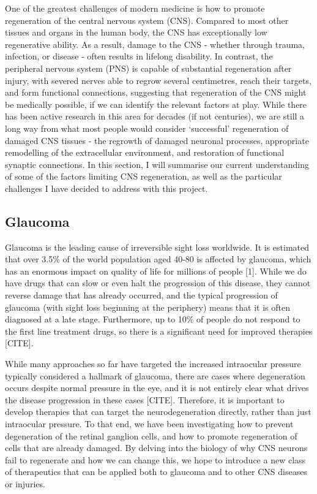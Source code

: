 \documentclass[
  12pt,
  a4paper,
]{book}
\begin{document}
One of the greatest challenges of modern medicine is how to promote regeneration of the central nervous system (CNS). Compared to most other tissues and organs in the human body, the CNS has exceptionally low regenerative ability. As a result, damage to the CNS - whether through trauma, infection, or disease - often results in lifelong disability. In contrast, the peripheral nervous system (PNS) is capable of substantial regeneration after injury, with severed nerves able to regrow several centimetres, reach their targets, and form functional connections, suggesting that regeneration of the CNS might be medically possible, if we can identify the relevant factors at play. While there has been active research in this area for decades (if not centuries), we are still a long way from what most people would consider `successful' regeneration of damaged CNS tissues - the regrowth of damaged neuronal processes, appropriate remodelling of the extracellular environment, and restoration of functional synaptic connections. In this section, I will summarise our current understanding of some of the factors limiting CNS regeneration, as well as the particular challenges I have decided to address with this project.

\hypertarget{glaucoma}{%
\subsection{Glaucoma}\label{glaucoma}}

Glaucoma is the leading cause of irreversible sight loss worldwide. It is estimated that over 3.5\% of the world population aged 40-80 is affected by glaucoma, which has an enormous impact on quality of life for millions of people {[}1{]}. While we do have drugs that can slow or even halt the progression of this disease, they cannot reverse damage that has already occurred, and the typical progression of glaucoma (with sight loss beginning at the periphery) means that it is often diagnosed at a late stage. Furthermore, up to 10\% of people do not respond to the first line treatment drugs, so there is a significant need for improved therapies {[}CITE{]}.

While many approaches so far have targeted the increased intraocular pressure typically considered a hallmark of glaucoma, there are cases where degeneration occurs despite normal pressure in the eye, and it is not entirely clear what drives the disease progression in these cases {[}CITE{]}. Therefore, it is important to develop therapies that can target the neurodegeneration directly, rather than just intraocular pressure. To that end, we have been investigating how to prevent degeneration of the retinal ganglion cells, and how to promote regeneration of cells that are already damaged. By delving into the biology of why CNS neurons fail to regenerate and how we can change this, we hope to introduce a new class of therapeutics that can be applied both to glaucoma and to other CNS diseases or injuries.
\end{document}
